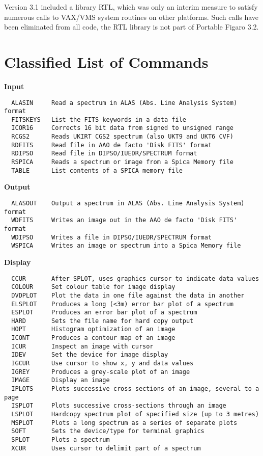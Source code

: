Version 3.1 included a library RTL, which was only an interim measure to
satisfy numerous calls to VAX/VMS system routines on
other platforms.  Such calls have been eliminated from all code, the
RTL library is not part of Portable Figaro 3.2.

 \onecolumn %
\appendix


\section{Classified List of Commands}
\label{classif}

{\bf Input}
\begin{verbatim}
  ALASIN     Read a spectrum in ALAS (Abs. Line Analysis System) format
  FITSKEYS   List the FITS keywords in a data file
  ICOR16     Corrects 16 bit data from signed to unsigned range
  RCGS2      Reads UKIRT CGS2 spectrum (also UKT9 and UKT6 CVF)
  RDFITS     Read file in AAO de facto 'Disk FITS' format
  RDIPSO     Read file in DIPSO/IUEDR/SPECTRUM format
  RSPICA     Reads a spectrum or image from a Spica Memory file
  TABLE      List contents of a SPICA memory file
\end{verbatim}
\goodbreak
{\bf Output}
\begin{verbatim}
  ALASOUT    Output a spectrum in ALAS (Abs. Line Analysis System) format
  WDFITS     Writes an image out in the AAO de facto 'Disk FITS' format
  WDIPSO     Writes a file in DIPSO/IUEDR/SPECTRUM format
  WSPICA     Writes an image or spectrum into a Spica Memory file
\end{verbatim}
\goodbreak
{\bf Display}
\begin{verbatim}
  CCUR       After SPLOT, uses graphics cursor to indicate data values
  COLOUR     Set colour table for image display
  DVDPLOT    Plot the data in one file against the data in another
  ELSPLOT    Produces a long (<3m) error bar plot of a spectrum
  ESPLOT     Produces an error bar plot of a spectrum
  HARD       Sets the file name for hard copy output
  HOPT       Histogram optimization of an image
  ICONT      Produces a contour map of an image
  ICUR       Inspect an image with cursor
  IDEV       Set the device for image display
  IGCUR      Use cursor to show x, y and data values
  IGREY      Produces a grey-scale plot of an image
  IMAGE      Display an image
  IPLOTS     Plots successive cross-sections of an image, several to a page
  ISPLOT     Plots successive cross-sections through an image
  LSPLOT     Hardcopy spectrum plot of specified size (up to 3 metres)
  MSPLOT     Plots a long spectrum as a series of separate plots
  SOFT       Sets the device/type for terminal graphics
  SPLOT      Plots a spectrum
  XCUR       Uses cursor to delimit part of a spectrum
\end{verbatim}
